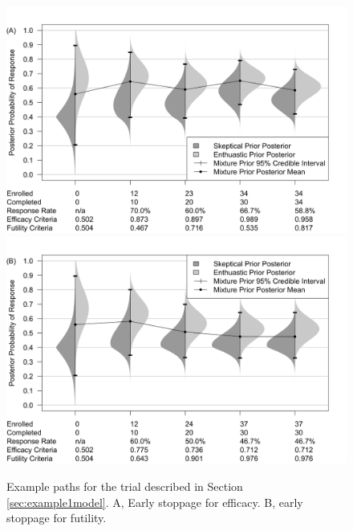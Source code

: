 \documentclass[useAMS,usenatbib,referee]{biom}
\begin{document}
\begin{figure}\begin{center}
    \includegraphics[width=6in]{figure2a.png}
    \includegraphics[width=6in]{figure2b.png}
    \caption{Example paths for the trial described in Section \ref{sec:example1model}. A, Early stoppage for efficacy. B, early stoppage for futility.}
	\label{fig:figure2}
\end{center}
\end{figure}
\end{document}
